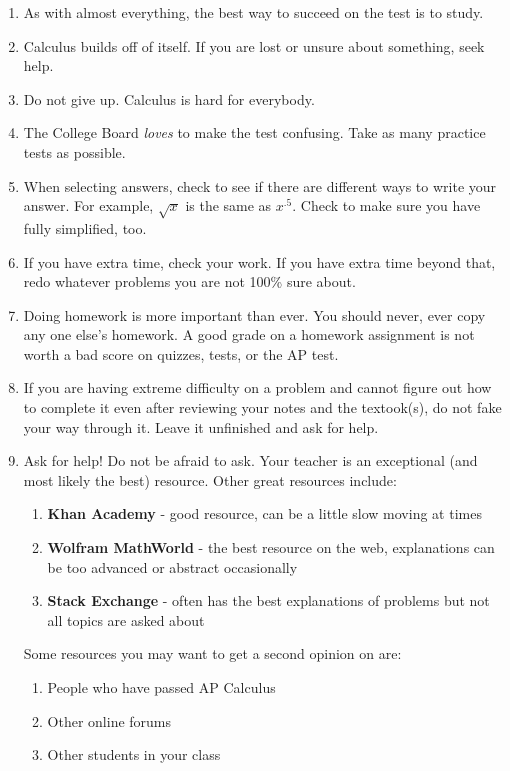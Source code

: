 \documentclass[../revisedmain.tex]{subfiles}
\begin{document}
	\begin{enumerate}
		\item As with almost everything, the best way to succeed on the test is to study.
		\item Calculus builds off of itself. If you are lost or unsure about something, seek help.
		\item Do not give up. Calculus is hard for everybody.
		\item The College Board \textit{loves} to make the test confusing. Take as many practice tests as possible.
		\item When selecting answers, check to see if there are different ways to write your answer. For example, \(\sqrt{x}\) is the same as \(x^{.5}\). Check to make sure you have fully simplified, too.
		\item If you have extra time, check your work. If you have extra time beyond that, redo whatever problems you are not 100\% sure about.
		\item Doing homework is more important than ever. You should never, ever copy any one else's homework. A good grade on a homework assignment is not worth a bad score on quizzes, tests, or the AP test.
		\item If you are having extreme difficulty on a problem and cannot figure out how to complete it even after reviewing your notes and the textook(s), do not fake your way through it. Leave it unfinished and ask for help.
		\item Ask for help! Do not be afraid to ask. Your teacher is an exceptional (and most likely the best) resource. Other great resources include:
		\begin{enumerate}
			\item \textbf{Khan Academy} - good resource, can be a little slow moving at times
			\item \textbf{Wolfram MathWorld} - the best resource on the web, explanations can be too advanced or abstract occasionally
			\item \textbf{Stack Exchange} - often has the best explanations of problems but not all topics are asked about
		\end{enumerate}
		Some resources you may want to get a second opinion on are:
		\begin{enumerate}
			\item People who have passed AP Calculus
			\item Other online forums
			\item Other students in your class
		\end{enumerate}
	\end{enumerate}
\end{document}
